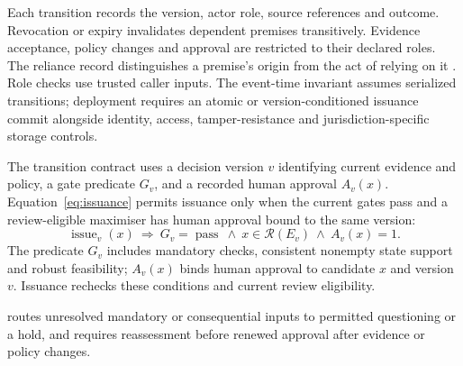 \documentclass[oneside,10pt,english]{swissi}
\begin{document}
Each transition records the version, actor role, source references and outcome. Revocation or expiry invalidates dependent premises transitively. Evidence acceptance, policy changes and approval are restricted to their declared roles. The reliance record distinguishes a premise's origin from the act of relying on it \parencite{kurz2026identity}. Role checks use trusted caller inputs. The event-time invariant assumes serialized transitions; deployment requires an atomic or version-conditioned issuance commit alongside identity, access, tamper-resistance and jurisdiction-specific storage controls.

The transition contract uses a decision version $v$ identifying current evidence and policy, a gate predicate $G_v$, and a recorded human approval $A_v(x)$. Equation~\eqref{eq:issuance} permits issuance only when the current gates pass and a review-eligible maximiser has human approval bound to the same version:
\begin{equation}
 \operatorname{issue}_v(x)\ \Longrightarrow\
 G_v=\operatorname{pass}\ \wedge\ x\in\mathcal R(E_v)\ \wedge\ A_v(x)=1.
 \label{eq:issuance}
\end{equation}
The predicate $G_v$ includes mandatory checks, consistent nonempty state support and robust feasibility; $A_v(x)$ binds human approval to candidate $x$ and version $v$. Issuance rechecks these conditions and current review eligibility.

 routes unresolved mandatory or consequential inputs to permitted questioning or a hold, and requires reassessment before renewed approval after evidence or policy changes.
\end{document}
